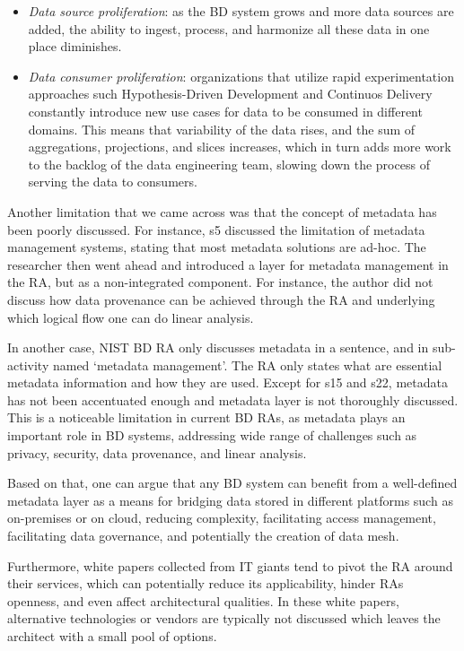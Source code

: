 \documentclass[review]{elsarticle}
\begin{document}
\begin{itemize}
    \item \emph{Data source proliferation}: as the BD system grows and more data
    sources are added, the ability to ingest, process, and harmonize all these data in one place diminishes.
    \item \emph{Data consumer proliferation}: organizations that utilize rapid experimentation approaches such Hypothesis-Driven Development and Continuos Delivery constantly introduce new use cases for data to be consumed in different domains. This means that variability of the data rises, and the sum of aggregations, projections, and slices increases, which in turn adds more work to the backlog of the data engineering team, slowing
    down the process of serving the data to consumers.
\end{itemize}

Another limitation that we came across was that the concept of metadata has been poorly discussed. For instance, s5 discussed the limitation of metadata management systems, stating that most metadata solutions are ad-hoc. The researcher then went ahead and introduced a layer for metadata management in the RA, but as a non-integrated component. For instance, the author did not discuss how data provenance can be achieved through the RA and underlying which logical flow one can do linear analysis. 

In another case, NIST BD RA only discusses metadata in a sentence, and in sub-activity named ‘metadata management’. The RA only states what are essential metadata information and how they are used. Except for s15 and s22, metadata has not been accentuated enough and metadata layer is not thoroughly discussed. This is a noticeable limitation in current BD RAs, as metadata plays an important role in BD systems, addressing wide range of challenges such as privacy, security, data provenance, and linear analysis. 

Based on that, one can argue that any BD system can benefit from a well-defined metadata layer as a means for bridging data stored in different platforms such as on-premises or on cloud, reducing complexity, facilitating access management, facilitating data governance, and potentially the creation of data mesh.

Furthermore, white papers collected from IT giants tend to pivot the RA around their services, which can potentially reduce its applicability, hinder RAs openness, and even affect architectural qualities. In these white papers, alternative technologies or vendors are typically not discussed which leaves the architect with a small pool of options.
\end{document}
